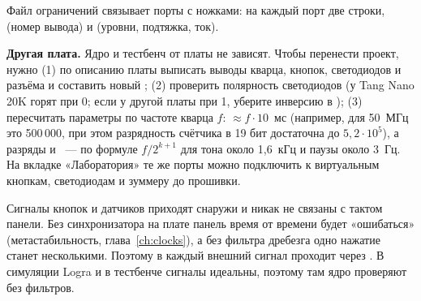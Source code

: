 Файл ограничений связывает порты  с ножками: на каждый порт
две строки,  (номер вывода) и  (уровни, подтяжка,
ток).


\textbf{Другая плата.} Ядро и тестбенч от платы не зависят. Чтобы перенести
проект, нужно (1) по описанию платы выписать выводы кварца, кнопок,
светодиодов и разъёма и составить новый ; (2) проверить полярность
светодиодов (у Tang Nano 20K горят при 0; если у другой платы при 1, уберите
инверсию в ); (3) пересчитать параметры по частоте кварца
$f$:  $\approx f\cdot 10$~мс (например, для 50~МГц это 500\,000, при
этом разрядность счётчика в  19 бит достаточна до $5{,}2\cdot
10^5$), а разряды  и ~--- по формуле $f/2^{k+1}$ для тона
около 1,6~кГц и паузы около 3~Гц. На вкладке «Лаборатория» те же порты можно
подключить к виртуальным кнопкам, светодиодам и зуммеру до прошивки.

\begin{warnbox}
Сигналы кнопок и датчиков приходят снаружи и никак не связаны с тактом
панели. Без синхронизатора на плате панель время от времени будет «ошибаться»
(метастабильность, глава~\ref{ch:clocks}), а без фильтра дребезга одно
нажатие станет несколькими. Поэтому в  каждый внешний
сигнал проходит через . В симуляции Logra и в тестбенче
сигналы идеальны, поэтому там ядро проверяют без фильтров.
\end{warnbox}

